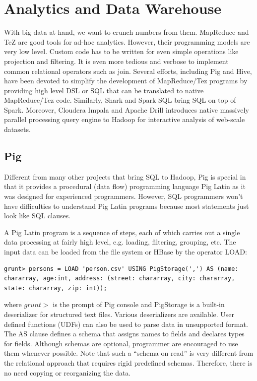 \documentclass[12pt]{book}
\begin{document}
\chapter{Analytics and Data Warehouse}
With big data at hand, we want to crunch numbers from them. MapReduce and TeZ are good tools for ad-hoc analytics. However, their programming models are very low level. Custom code has to be written for even simple operations like projection and filtering. It is even more tedious and verbose to implement common relational operators such as join. Several efforts, including Pig and Hive, have been devoted to simplify the development of MapReduce/Tez programs by providing high level DSL or SQL that can be translated to native MapReduce/Tez code. Similarly, Shark and Spark SQL bring SQL on top of Spark. Moreover, Cloudera Impala and Apache Drill introduces native massively parallel processing query engine to Hadoop for interactive analysis of web-scale datasets. 

\section{Pig}
Different from many other projects that bring SQL to Hadoop, Pig is special in that it provides a procedural (data flow) programming language Pig Latin as it was designed for experienced programmers. However, SQL programmers won't have difficulties to understand Pig Latin programs because most statements just look like SQL clauses.

A Pig Latin program is a sequence of steps, each of which carries out a single data processing at fairly high level, e.g. loading, filtering, grouping, etc. The input data can be loaded from the file system or HBase by the operator LOAD:

\begin{lstlisting}
grunt> persons = LOAD 'person.csv' USING PigStorage(',') AS (name: chararray, age:int, address: (street: chararray, city: chararray, state: chararray, zip: int));
\end{lstlisting}
where $grunt>$ is the prompt of Pig console and PigStorage is a built-in deserializer for structured text files. Various deserializers are available. User defined functions (UDFs) can also be used to parse data in unsupported format. The AS clause defines a schema that assigns names to fields and declares types for fields. Although schemas are optional, programmer are encouraged to use them whenever possible. Note that such a ``schema on read'' is very different from the relational approach that requires rigid predefined schemas. Therefore, there is no need copying or reorganizing the data.
\end{document}
